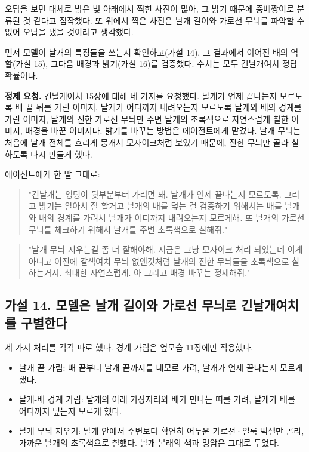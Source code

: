 \documentclass[11pt]{article}
\begin{document}
오답을 보면 대체로 밝은 빛 아래에서 찍힌 사진이 많아, 그 밝기 때문에 중베짱이로 분류된 것 같다고 짐작했다. 또 위에서 찍은 사진은 날개 길이와 가로선 무늬를 파악할 수 없어 오답을 냈을 것이라고 생각했다.

먼저 모델이 날개의 특징들을 쓰는지 확인하고(가설 14), 그 결과에서 이어진 배의 역할(가설 15), 그다음 배경과 밝기(가설 16)를 검증했다. 수치는 모두 긴날개여치 정답 확률이다.

\textbf{정제 요청.} 긴날개여치 15장에 대해 네 가지를 요청했다. 날개가 언제 끝나는지 모르도록 배 끝 뒤를 가린 이미지, 날개가 어디까지 내려오는지 모르도록 날개와 배의 경계를 가린 이미지, 날개의 진한 가로선 무늬만 주변 날개의 초록색으로 자연스럽게 칠한 이미지, 배경을 바꾼 이미지다. 밝기를 바꾸는 방법은 에이전트에게 맡겼다. 날개 무늬는 처음에 날개 전체를 흐리게 뭉개서 모자이크처럼 보였기 때문에, 진한 무늬만 골라 칠하도록 다시 만들게 했다.

에이전트에게 한 말 그대로:
\begin{quote}
"긴날개는 엉덩이 뒷부분부터 가리면 돼. 날개가 언제 끝나는지 모르도록. 그리고 밝기는 알아서 잘 할거고 날개의 배를 덮는 걸 검증하기 위해서는 배를 날개와 배의 경계를 가려서 날개가 어디까지 내려오는지 모르게해. 또 날개의 가로선 무늬를 체크하기 위해서 날개를 주변 초록색으로 칠해줘."
\end{quote}
\begin{quote}
"날개 무늬 지우는걸 좀 더 잘해야해. 지금은 그냥 모자이크 처리 되었는데 이게 아니고 이전에 갈색여치 무늬 없앤것처럼 날개의 진한 무늬들을 초록색으로 칠하는거지. 최대한 자연스럽게. 아 그리고 배경 바꾸는 정제해줘."
\end{quote}

\subsection*{가설 14. 모델은 날개 길이와 가로선 무늬로 긴날개여치를 구별한다}

세 가지 처리를 각각 따로 했다. 경계 가림은 옆모습 11장에만 적용했다.
\begin{itemize}
\item 날개 끝 가림: 배 끝부터 날개 끝까지를 네모로 가려, 날개가 언제 끝나는지 모르게 했다.
\item 날개-배 경계 가림: 날개의 아래 가장자리와 배가 만나는 띠를 가려, 날개가 배를 어디까지 덮는지 모르게 했다.
\item 날개 무늬 지우기: 날개 안에서 주변보다 확연히 어두운 가로선·얼룩 픽셀만 골라, 가까운 날개의 초록색으로 칠했다. 날개 본래의 색과 명암은 그대로 두었다.
\end{itemize}
\end{document}
